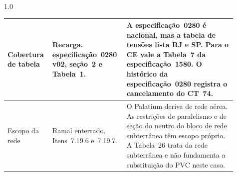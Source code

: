 \begin{minipage}{\linewidth}
\begin{Spacing}{1.0}
{\begin{tabular}{|>{\raggedright\arraybackslash}p{0.16\linewidth}|>{\raggedright\arraybackslash}p{0.29\linewidth}|>{\raggedright\arraybackslash}p{0.46\linewidth}|}
    Cobertura de tabela & Recarga. especificação~0280 v02, seção~2 e Tabela~1. & A especificação~0280 é nacional, mas a tabela de tensões lista RJ e SP. Para o CE vale a Tabela~7 da especificação~1580. O histórico da especificação~0280 registra o cancelamento do CT~74. \\\hline
    Escopo da rede & Ramal enterrado. Itens~7.19.6 e~7.19.7. & O Palatium deriva de rede aérea. As restrições de paralelismo e de seção do neutro do bloco de rede subterrânea têm escopo próprio. A Tabela~26 trata da rede subterrânea e não fundamenta a substituição do PVC neste caso. \\\hline
  \end{tabular}}
  \end{Spacing}
\end{minipage}
\par
